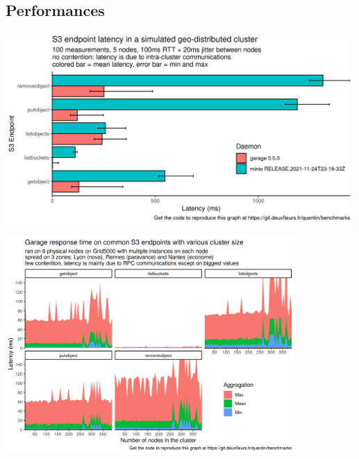 \documentclass[11pt, aspectratio=1610]{beamer}
\begin{document}
\subsection{Performances}
\begin{frame}
\begin{center}
\includegraphics[width=13.25cm]{rpc-amplification.png}
\end{center}
\end{frame}

\begin{frame}
\begin{center}
\includegraphics[width=11cm]{rpc-complexity.png}
\end{center}
\end{frame}
\end{document}
